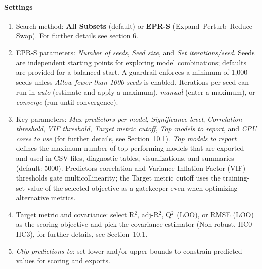 \documentclass[11pt,a4paper]{article}
\begin{document}
\paragraph{Settings}
  \begin{enumerate}[label=\arabic*.]
    \item Search method: \textbf{All Subsets} (default) or \textbf{EPR-S} (Expand--Perturb--Reduce--Swap). For further details see section 6.
    \item EPR-S parameters: \emph{Number of seeds}, \emph{Seed size}, and \emph{Set iterations/seed}. Seeds are independent starting points for exploring model combinations; defaults are provided for a balanced start. A guardrail enforces a minimum of 1{,}000 seeds unless \emph{Allow fewer than 1000 seeds} is enabled. Iterations per seed can run in \textit{auto} (estimate and apply a maximum), \textit{manual} (enter a maximum), or \textit{converge} (run until convergence).
    \item Key parameters: \emph{Max predictors per model}, \emph{Significance level}, \emph{Correlation threshold}, \emph{VIF threshold}, \emph{Target metric cutoff}, \emph{Top models to report}, and \emph{CPU cores to use} (for further details, see Section~10.1). \emph{Top models to report} defines the maximum number of top-performing models that are exported and used in CSV files, diagnostic tables, visualizations, and summaries (default: 5000). Predictors correlation and Variance Inflation Factor (VIF) thresholds gate multicollinearity; the Target metric cutoff uses the training-set value of the selected objective as a gatekeeper even when optimizing alternative metrics.
    \item Target metric and covariance: select R$^2$, adj-R$^2$, Q$^2$ (LOO), or RMSE (LOO) as the scoring objective and pick the covariance estimator (Non-robust, HC0--HC3), for further details, see Section~10.1.
    \item \emph{Clip predictions to}: set lower and/or upper bounds to constrain predicted values for scoring and exports.
  \end{enumerate}
\end{document}
